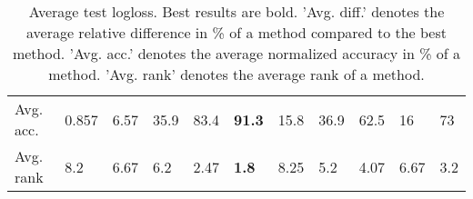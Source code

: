 \begin{table}[ht!]
\begin{tabular}{lllllllllll}
  Avg. acc. & 0.857 & 6.57 & 35.9 & 83.4 & \textbf{91.3} & 15.8 & 36.9 & 62.5 & 16 & 73 \\ 
  Avg. rank & 8.2 & 6.67 & 6.2 & 2.47 & \textbf{1.8} & 8.25 & 5.2 & 4.07 & 6.67 & 3.2 \\ 
   \hline
\hline
\end{tabular}
\endgroup
\caption{Average test logloss. 
                  Best results are bold. 
                  'Avg. diff.' denotes the average relative difference in \% of a method compared to the best method.
                  'Avg. acc.' denotes the average normalized accuracy in \% of a method.
                  'Avg. rank' denotes the average rank of a method.} 
\label{TABLES/table_results_logloss_umap}
\end{table}

